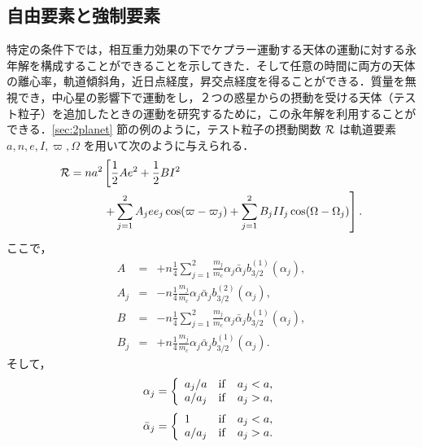 \documentclass[11pt,a4paper,oneside,onecolumn]{jreport}
\begin{document}
\subsection{自由要素と強制要素 \label{sec:free_forced}}
特定の条件下では，相互重力効果の下でケプラー運動する天体の運動に対する永年解を構成することができることを示してきた．そして任意の時間に両方の天体の離心率，軌道傾斜角，近日点経度，昇交点経度を得ることができる．質量を無視でき，中心星の影響下で運動をし，２つの惑星からの摂動を受ける天体（テスト粒子）を追加したときの運動を研究するために，この永年解を利用することができる．\ref{sec:2planet} 節の例のように，テスト粒子の摂動関数 ${\cal R}$ は軌道要素 $a, n, e, I, \varpi, \Omega$ を用いて次のように与えられる．
\begin{equation}
\begin{split}
{\cal R} = n a^2 & \left[ \frac{1}{2} A e^2 + \frac{1}{2} B I^2 \right. \\
& \left. + \sum_{j = 1}^2  A_j e e_j \cos (\varpi - \varpi_j) + \sum_{j = 1}^2 B_j I I_j \cos (\Omega - \Omega_j) \right]. \\
\end{split} \label{}
\end{equation} 
ここで，
\begin{eqnarray}
A & = & + n \frac{1}{4} \sum_{j = 1}^2 \frac{m_j}{m_c} \alpha_j \bar{\alpha}_j b_{3/2}^{(1)} (\alpha_j), \label{eq:A_test} \\
A_j & = & - n \frac{1}{4} \frac{m_j}{m_c} \alpha_j \bar{\alpha}_j b_{3/2}^{(2)} (\alpha_j), \label{eq:A_j_test} \\
B & = & - n \frac{1}{4} \sum_{j = 1}^2 \frac{m_j}{m_c} \alpha_j \bar{\alpha}_j b_{3/2}^{(1)} (\alpha_j), \label{eq:B_test} \\
B_j & = & + n \frac{1}{4} \frac{m_j}{m_c} \alpha_j \bar{\alpha}_j b_{3/2}^{(1)} (\alpha_j). \label{eq:B_j_test}
\end{eqnarray}
そして，
\begin{equation}
\alpha_j = \left\{
\begin{array}{lll}
a_j / a & {\rm if} & a_j < a, \\
a / a_j & {\rm if} & a_j > a,
\end{array}
\right.
\end{equation}
\begin{equation}
\bar{\alpha}_j = \left\{
\begin{array}{lll}
1 & {\rm if} & a_j < a, \\
a / a_j & {\rm if} & a_j > a.
\end{array}
\right.
\end{equation}
\end{document}
